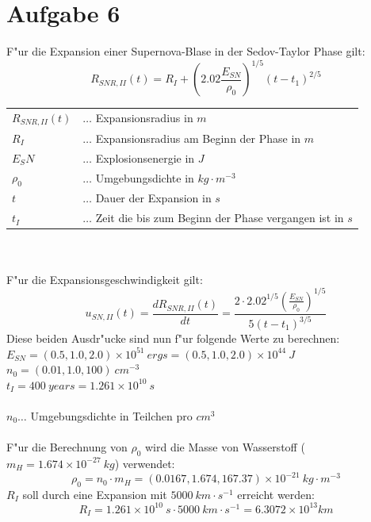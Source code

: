\section{Aufgabe 6}
F"ur die Expansion einer Supernova-Blase in der Sedov-Taylor Phase gilt:
\begin{equation}
R_{SNR,II}(t)=R_I + \left( 2.02 \frac{E_{SN}}{\rho_0} \right) ^{1/5}(t-t_1)^{2/5}
\end{equation}
\begin{tabular}{l l}
\(R_{SNR,II}(t)\)&\(\dots\) Expansionsradius in \(m\)\\
\(R_I\)&\(\dots\) Expansionsradius am Beginn der Phase in \(m\)\\
\(E_SN\)&\(\dots\) Explosionsenergie in \(J\)\\
\(\rho_0\)&\(\dots\) Umgebungsdichte in \(kg \cdot m^{-3}\)\\
\(t\)&\(\dots\) Dauer der Expansion in \(s\)\\
\(t_I\)&\(\dots\) Zeit die bis zum Beginn der Phase vergangen ist in \(s\)\\
\end{tabular}\\
\\
F"ur die Expansionsgeschwindigkeit gilt:
\begin{equation}
u_{SN,II}(t) = \frac{dR_{SNR,II}(t)}{dt}=\frac{2 \cdot 2.02^{1/5} \left( \frac{E_{SN}}{\rho_0} \right) ^{1/5}}{5(t-t_1)^{3/5}}
\end{equation}
Diese beiden Ausdr"ucke sind nun f"ur folgende Werte  zu berechnen:\\
\(E_{SN}=(0.5,1.0,2.0) \times 10^{51}~ergs = (0.5,1.0,2.0) \times 10^{44}~J\)\\
\(n_0=(0.01,1.0,100)~cm^{-3}\)\\
\(t_I=400~years=1.261 \times 10^{10}~s\)\\
\\
\(n_0\dots\) Umgebungsdichte in Teilchen pro \(cm^3\)\\
\\
F"ur die Berechnung von \(\rho_0\) wird die Masse von Wasserstoff (\(m_H=1.674 \times 10^{-27}~kg\)) verwendet:
\begin{equation}
\rho_0=n_0 \cdot m_H=(0.0167,1.674,167.37) \times 10^{-21}~kg \cdot m^{-3}
\end{equation}
\(R_I\) soll durch eine Expansion mit \(5000~km \cdot s^{-1}\) erreicht werden:
\begin{equation}
R_I=1.261 \times 10^{10}~s \cdot 5000~km \cdot s^{-1} = 6.3072 \times 10^{13} km
\end{equation}
